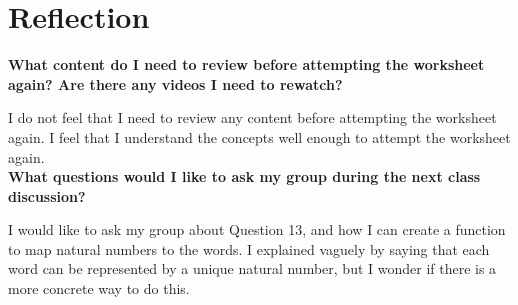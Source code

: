 \documentclass[article, 12pt]{article}
\theoremstyle{definition}
\begin{document}
    \section{Reflection}
    \textbf{What content do I need to review before attempting the worksheet again? Are there any videos I need to rewatch?}

    I do not feel that I need to review any content before attempting the worksheet again. I feel that I understand the concepts well enough to attempt the worksheet again.
    \\[12pt]
    \textbf{What questions would I like to ask my group during the next class discussion?}

    I would like to ask my group about Question 13, and how I can create a function to map natural numbers to the words. I explained vaguely by saying that each word can be represented by a unique natural number, but I wonder if there is a more concrete way to do this.
\end{document}
